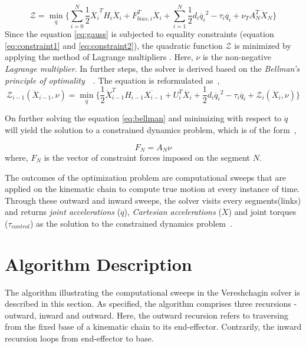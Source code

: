  \begin{equation} \label{eq:minimization}
 \mathcal{Z} = \min_{\ddot{q}} \Big \{\sum_{i=0}^{N} \frac{1}{2} \ddot{X_i}^T H_i \ddot{X_i} + F_{bias, i}^T\ddot{X_i} + \sum_{i=1}^{N} \frac{1}{2} d_i \ddot{q_i}^2 - \tau_i \ddot{q_i} + \nu_T A^T_N \ddot{X}_N \Big \}
 \end{equation} 
Since the equation \ref{eq:gauss} is subjected to equality constraints (equation \ref{eq:constraint1} and \ref{eq:constraint2}), the quadratic function $\mathcal{Z}$ is minimized by applying the method of Lagrange multipliers \cite{bertsekas2014constrained}. Here, $\nu$ is the non-negative \textit{Lagrange multiplier}. In further steps, the solver is derived based on the \textit{Bellman's principle of optimality}~\cite{bertsekas1996dynamic}~\cite{bellman2013dynamic}. The equation is reformulated  as~\cite{shakhimardanov2015composable},
 \begin{equation} \label{eq:bellman}
 \mathcal{Z}_{i-1}(\ddot{X}_{i-1}, \nu) = \min_{\ddot{q}} \Big \{ \frac{1}{2} \ddot{X}_{i-1}^T H_{i-1} \ddot{X_{i-1}} + U_i^T\ddot{X_i} + \frac{1}{2} d_i \ddot{q_i}^2 - \tau_i \ddot{q_i} + \mathcal{Z}_i(\ddot{X}_i, \nu)\Big \}
 \end{equation} 
 
 On further solving the equation \ref{eq:bellman} and minimizing with respect to $\ddot{q}$ will yield the solution to a constrained dynamics problem, which is of the form~\cite{shakhimardanov2015composable}, 
 
  \begin{equation}\label{eq:solution}
  F_N = A_N \nu
  \end{equation}
where, $F_N$ is the vector of constraint forces imposed on the segment $N$.


The outcomes of the optimization problem are computational sweeps that are applied on the kinematic chain to compute true motion at every instance of time. Through these outward and inward sweeps, the solver visits every segments(links) and returns \textit{joint accelerations} ($\ddot{q}$), \textit{Cartesian accelerations} ($\ddot{X}$) and joint torques ($\tau_{control}$) as the solution to the constrained dynamics problem~\cite{shakhimardanov2015composable}. 

\section{Algorithm Description}

The algorithm illustrating the computational sweeps in the Vereshchagin solver is described in this section. As specified, the algorithm comprises three recursions - outward, inward and outward. Here, the outward recursion refers to traversing from the fixed base of a kinematic chain to its end-effector. Contrarily, the inward recursion loops from end-effector to base. 

